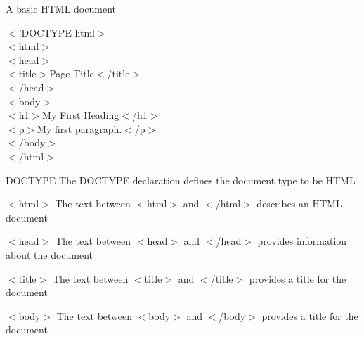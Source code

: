 \documentclass[pdf]{beamer}
\begin{document}
\begin{frame}
A basic HTML document
\begin{examples}
$<$!DOCTYPE html$>$ \\
$<$html$>$ \\
$<$head$>$ \\
$<$title$>$Page Title$<$/title$>$ \\
$<$/head$>$ \\
$<$body$>$ \\

$<$h1$>$My First Heading$<$/h1$>$ \\
$<$p$>$My first paragraph.$<$/p$>$ \\

$<$/body$>$ \\
$<$/html$>$ \\
\end{examples}
\end{frame}

\begin{frame}
\begin{block}{DOCTYPE}
The DOCTYPE declaration defines the document type to be HTML
\end{block}
\end{frame}

\begin{frame}
\begin{block}{$<$html$>$}
The text between $<$html$>$ and $<$/html$>$ describes an HTML document
\end{block}

\begin{block}{$<$head$>$}
The text between $<$head$>$ and $<$/head$>$ provides information about the document
\end{block}

\end{frame}

\begin{frame}
\begin{block}{$<$title$>$}
The text between $<$title$>$ and $<$/title$>$ provides a title for the document
\end{block}

\begin{block}{$<$body$>$}
The text between $<$body$>$ and $<$/body$>$ provides a title for the document
\end{block}
\end{frame}
\end{document}
